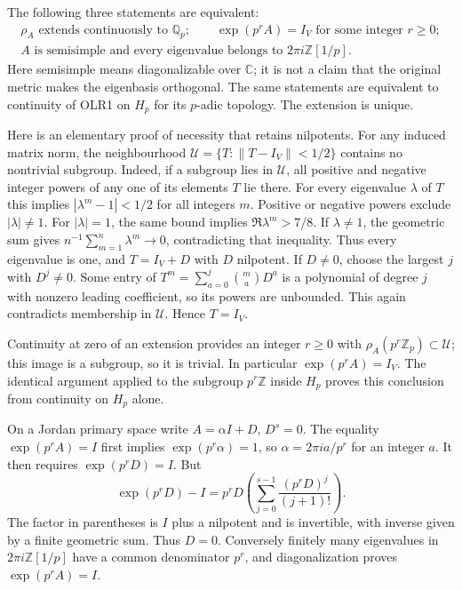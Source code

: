 The following three statements are equivalent:
\[
\begin{gathered}
\rho_A\text{ extends continuously to }\mathbb Q_p;\qquad
\exp(p^r A)=I_V\text{ for some integer }r\ge0;\\
A\text{ is semisimple and every eigenvalue belongs to }
                          2\pi i\mathbb Z[1/p].
\end{gathered}
\tag{OLR2}
\]
Here semisimple means diagonalizable over $\mathbb C$; it is not a
claim that the original metric makes the eigenbasis orthogonal.
The same statements are equivalent to continuity of OLR1 on $H_p$
for its $p$-adic topology. The extension is unique.

Here is an elementary proof of necessity that retains nilpotents.
For any induced matrix norm, the neighbourhood
$\mathcal U=\{T:\|T-I_V\|<1/2\}$ contains no nontrivial subgroup.
Indeed, if a subgroup lies in $\mathcal U$, all positive and negative
integer powers of any one of its elements $T$ lie there.
For every eigenvalue $\lambda$ of $T$ this implies
$|\lambda^m-1|<1/2$ for all integers $m$.
Positive or negative powers exclude $|\lambda|\ne1$.
For $|\lambda|=1$, the same bound implies
$\Re\lambda^m>7/8$. If $\lambda\ne1$, the geometric sum gives
$n^{-1}\sum_{m=1}^n\lambda^m\to0$, contradicting that inequality.
Thus every eigenvalue is one, and $T=I_V+D$ with $D$ nilpotent.
If $D\ne0$, choose the largest $j$ with $D^j\ne0$. Some entry of
$T^m=\sum_{a=0}^j\binom maD^a$ is a polynomial of degree $j$
with nonzero leading coefficient, so its powers are unbounded.
This again contradicts membership in $\mathcal U$. Hence $T=I_V$.

Continuity at zero of an extension provides an integer $r\ge0$ with
$\rho_A(p^r\mathbb Z_p)\subset\mathcal U$; this image is a subgroup,
so it is trivial. In particular $\exp(p^rA)=I_V$.
The identical argument applied to the subgroup $p^r\mathbb Z$
inside $H_p$ proves this conclusion from continuity on $H_p$ alone.

On a Jordan primary space write $A=\alpha I+D$, $D^s=0$.
The equality $\exp(p^rA)=I$ first implies
$\exp(p^r\alpha)=1$, so $\alpha=2\pi i a/p^r$ for an integer $a$.
It then requires $\exp(p^rD)=I$. But
\[
\exp(p^rD)-I
=p^rD\left(\sum_{j=0}^{s-1}\frac{(p^rD)^j}{(j+1)!}\right).
\tag{OLR3}
\]
The factor in parentheses is $I$ plus a nilpotent and is invertible,
with inverse given by a finite geometric sum. Thus $D=0$.
Conversely finitely many eigenvalues in $2\pi i\mathbb Z[1/p]$
have a common denominator $p^r$, and diagonalization proves
$\exp(p^rA)=I$.

